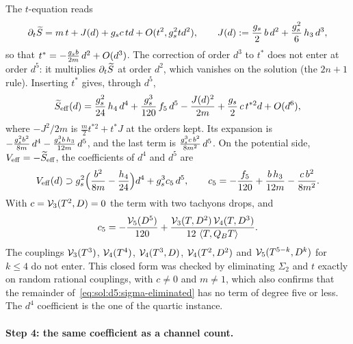 The $t$-equation reads
\begin{equation}
  \partial_t \caction
    = m \, t
      + J(d)
      + \gs c \, t d
      + O(t^2, \gs^2 t d^2),
  \qquad
  J(d)
    := \frac{\gs}{2} \, b \, d^2
      + \frac{\gs^2}{6} \, h_3 \, d^3,
\end{equation}
so that $t^* = - \tfrac{\gs b}{2 m} \, d^2 + O(d^3)$.
The correction of order $d^3$ to $t^*$ does not enter at order $d^5$: it multiplies $\partial_t \caction$ at order $d^2$, which vanishes on the solution (the $2 n + 1$ rule).
Inserting $t^*$ gives, through $d^5$,
\begin{equation}
  \caction[\rm eff](d)
    = \frac{\gs^2}{24} \, h_4 \, d^4
      + \frac{\gs^3}{120} \, f_5 \, d^5
      - \frac{J(d)^2}{2 m}
      + \frac{\gs}{2} \, c \, t^{* 2} d
      + O(d^6),
\end{equation}
where $- J^2 / 2 m$ is $\tfrac{m}{2} t^{* 2} + t^* J$ at the orders kept.
Its expansion is $- \tfrac{\gs^2 b^2}{8 m} \, d^4 - \tfrac{\gs^3 b \, h_3}{12 m} \, d^5$, and the last term is $\tfrac{\gs^3 c \, b^2}{8 m^2} \, d^5$.
On the potential side, $V_{\rm eff} = - \caction[\rm eff]$, the coefficients of $d^4$ and $d^5$ are
\begin{equation}
  \label{eq:sol:d5:c5}
  V_{\rm eff}(d)
    \supset \gs^2 \Big( \frac{b^2}{8 m} - \frac{h_4}{24} \Big) d^4
      + \gs^3 c_5 \, d^5,
  \qquad
  c_5
    = - \frac{f_5}{120}
      + \frac{b \, h_3}{12 m}
      - \frac{c \, b^2}{8 m^2}.
\end{equation}
With $c = \vertex{3}(T^2, D) = 0$ the term with two tachyons drops, and
\begin{equation}
  \label{eq:sol:d5:c5-final}
  c_5
    = - \frac{\vertex{5}(D^5)}{120}
      + \frac{\vertex{3}(T, D^2) \, \vertex{4}(T, D^3)}{12 \, \pair{T}{Q_B T}}.
\end{equation}
The couplings $\vertex{3}(T^3)$, $\vertex{4}(T^4)$, $\vertex{4}(T^3, D)$, $\vertex{4}(T^2, D^2)$ and $\vertex{5}(T^{5 - k}, D^k)$ for $k \le 4$ do not enter.
This closed form was checked by eliminating $\Sigma_2$ and $t$ exactly on random rational couplings, with $c \neq 0$ and $m \neq 1$, which also confirms that the remainder of~\eqref{eq:sol:d5:sigma-eliminated} has no term of degree five or less.
The $d^4$ coefficient is the one of the quartic instance.

\paragraph{Step 4: the same coefficient as a channel count.}

